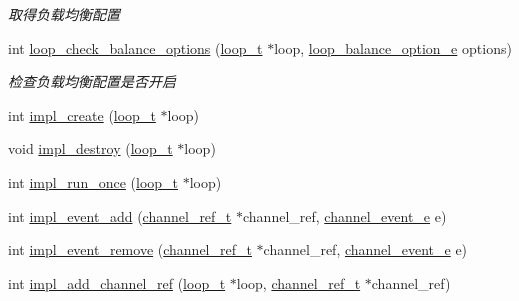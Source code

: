 \begin{DoxyCompactItemize}
\begin{DoxyCompactList}\small\item\em 取得负载均衡配置 \end{DoxyCompactList}\item 
int \hyperlink{a00070_aff034d62b761d4ebad97180fb55a4582_aff034d62b761d4ebad97180fb55a4582}{loop\+\_\+check\+\_\+balance\+\_\+options} (\hyperlink{a00051_a9c3ad1cd2de83e09f3a7b59fa82c94ee_a9c3ad1cd2de83e09f3a7b59fa82c94ee}{loop\+\_\+t} $\ast$loop, \hyperlink{a00051_a6c87150c8f33855c3427c783480fd8ba_a6c87150c8f33855c3427c783480fd8ba}{loop\+\_\+balance\+\_\+option\+\_\+e} options)
\begin{DoxyCompactList}\small\item\em 检查负载均衡配置是否开启 \end{DoxyCompactList}\item 
int \hyperlink{a00070_a182ab27e7200de7cea5aa0a4aa71a519_a182ab27e7200de7cea5aa0a4aa71a519}{impl\+\_\+create} (\hyperlink{a00051_a9c3ad1cd2de83e09f3a7b59fa82c94ee_a9c3ad1cd2de83e09f3a7b59fa82c94ee}{loop\+\_\+t} $\ast$loop)
\item 
void \hyperlink{a00070_ae6a6b7adc5e89d55352e0d54aa603915_ae6a6b7adc5e89d55352e0d54aa603915}{impl\+\_\+destroy} (\hyperlink{a00051_a9c3ad1cd2de83e09f3a7b59fa82c94ee_a9c3ad1cd2de83e09f3a7b59fa82c94ee}{loop\+\_\+t} $\ast$loop)
\item 
int \hyperlink{a00070_af6be25e4d8b08e68ad1730611fc7f15c_af6be25e4d8b08e68ad1730611fc7f15c}{impl\+\_\+run\+\_\+once} (\hyperlink{a00051_a9c3ad1cd2de83e09f3a7b59fa82c94ee_a9c3ad1cd2de83e09f3a7b59fa82c94ee}{loop\+\_\+t} $\ast$loop)
\item 
int \hyperlink{a00070_ae6d969c43313283fd7490201d637e29f_ae6d969c43313283fd7490201d637e29f}{impl\+\_\+event\+\_\+add} (\hyperlink{a00051_a151271c9d188ef28d4d24bb81dcc1263_a151271c9d188ef28d4d24bb81dcc1263}{channel\+\_\+ref\+\_\+t} $\ast$channel\+\_\+ref, \hyperlink{a00051_a5ad43ab162fdf9ad53cde10ed3d87d99_a5ad43ab162fdf9ad53cde10ed3d87d99}{channel\+\_\+event\+\_\+e} e)
\item 
int \hyperlink{a00070_a687cfc12a5dba8228bb411d4cf81df26_a687cfc12a5dba8228bb411d4cf81df26}{impl\+\_\+event\+\_\+remove} (\hyperlink{a00051_a151271c9d188ef28d4d24bb81dcc1263_a151271c9d188ef28d4d24bb81dcc1263}{channel\+\_\+ref\+\_\+t} $\ast$channel\+\_\+ref, \hyperlink{a00051_a5ad43ab162fdf9ad53cde10ed3d87d99_a5ad43ab162fdf9ad53cde10ed3d87d99}{channel\+\_\+event\+\_\+e} e)
\item 
int \hyperlink{a00070_a27621a2037d9d1ad2f04e1b45bb63c6c_a27621a2037d9d1ad2f04e1b45bb63c6c}{impl\+\_\+add\+\_\+channel\+\_\+ref} (\hyperlink{a00051_a9c3ad1cd2de83e09f3a7b59fa82c94ee_a9c3ad1cd2de83e09f3a7b59fa82c94ee}{loop\+\_\+t} $\ast$loop, \hyperlink{a00051_a151271c9d188ef28d4d24bb81dcc1263_a151271c9d188ef28d4d24bb81dcc1263}{channel\+\_\+ref\+\_\+t} $\ast$channel\+\_\+ref)

\end{DoxyCompactItemize}
